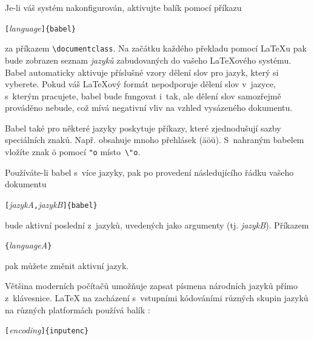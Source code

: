 Je-li váš systém %
nakonfigurován, aktivujte balík
 pomocí příkazu
\begin{lscommand}
\verb|[|\emph{language}\verb|]{babel}|
\end{lscommand}

\noindent za příkazem \verb|\documentclass|. Na začátku každého překladu
pomocí \LaTeX u pak bude zobrazen seznam \emph{jazyků} zabudovaných do
vašeho \LaTeX ového systému. \textsf{Babel} automaticky aktivuje příslušné vzory
dělení slov pro jazyk, který si vyberete. Pokud váš \LaTeX ový formát
nepodporuje dělení slov v~jazyce, s~kterým pracujete, \textsf{babel} bude fungovat
i~tak, ale dělení slov samozřejmě prováděno nebude, což mívá negativní
vliv na vzhled vysázeného dokumentu.

\textsf{Babel} také pro některé jazyky poskytuje příkazy, které zjednodušují
sazby speciálních znaků. Např.  obsahuje mnoho přehlásek
(\"a\"o\"u). S~nahraným \textsf{babel}em vložíte znak \"o pomocí
\verb|"o| místo~\verb|\"o|.

Používáte-li \textsf{babel} s~více jazyky, pak po provedení následujícího řádku
vašeho dokumentu
\begin{lscommand}
\verb|[|\emph{jazykA}\verb|,|\emph{jazykB}\verb|]{babel}| 
\end{lscommand}

\noindent bude aktivní poslední z~jazyků, uvedených jako argumenty
 (tj. \emph{jazykB}). Příkazem
\begin{lscommand}
\verb|{|\emph{languageA}\verb|}|
\end{lscommand}

\noindent pak můžete změnit aktivní jazyk.

\newcommand{\ieih}[1]{%
\index{kódování!vstupní!#1@\texttt{#1}}%
\index{vstupní kódování!#1@\texttt{#1}}%
\index{#1@\texttt{#1}}}
\newcommand{\iei}[1]{%
\ieih{#1}\texttt{#1}}
\newcommand{\feih}[1]{%
\index{kódování!fontů!#1@\texttt{#1}}%
\index{font -- kódování!#1@\texttt{#1}}%
\index{#1@\texttt{#1}}}
\newcommand{\fei}[1]{%
\feih{#1}\texttt{#1}}

Většina moderních počítačů umožňuje zapsat písmena národních jazyků
přímo z~klávesnice. \LaTeX{} na zacházení s~vstupními kódováními
různých skupin jazyků na různých platformách používá balík :
\begin{lscommand}
\verb|[|\emph{encoding}\verb|]{inputenc}|
\end{lscommand}

